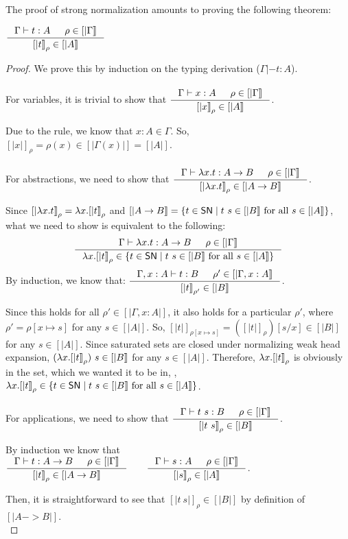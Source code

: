 The proof of strong normalization amounts to proving the following theorem:
\begin{theorem}
$ \inference{\Gamma|- t:A & \rho \in [|\Gamma|]}{[|t|]_\rho \in [|A|]} $
\end{theorem}
\begin{proof}
We prove this by induction on the typing derivation ($\Gamma|- t:A$).
\paragraph{}
For variables, it is trivial to show that
$ \inference{\Gamma |- x:A & \rho \in [|\Gamma|]}{[|x|]_\rho \in [|A|]} $.

Due to the  rule, we know that $x:A \in \Gamma$.
So, $[|x|]_\rho =\rho(x)\in[|\Gamma(x)|] = [|A|]$.

\paragraph{}
For abstractions, we need to show that
$ \inference{\Gamma |- \l x.t : A -> B & \rho \in [|\Gamma|]}
	     {[|\l x.t|]_\rho \in [|A -> B|]} $.

Since $[|\lambda x.t|]_\rho = \lambda x.[|t|]_\rho$ and
$[|A -> B|] = \{ t\in \mathsf{SN} \mid t~s\in[|B|]~\text{for all}~s\in[|A|] \}$,
what we need to show is equivalent to the following:
\[ \inference{\Gamma |- \l x.t : A -> B & \rho \in [|\Gamma|]}
	     {\l x.[|t|]_\rho \in
		\{ t\in \SN \mid t~s\in[|B|] ~\text{for all}~ s\in[|A|] \} }
\]
By induction, we know that:
$ \inference{\Gamma,x:A |- t : B & \rho' \in [|\Gamma,x:A|]}
	     {[|t|]_{\rho'} \in [|B|]} $.

Since this holds for all $\rho' \in [|\Gamma,x:A|]$, it also holds
for a particular $\rho'$, where $\rho' = \rho[x \mapsto s]$ for any $s \in [|A|]$.
So, $[|t|]_{\rho[x\mapsto s]} = ([|t|]_\rho)[s/x]\in[|B|]$ for any $s\in[|A|]$.
Since saturated sets are closed under normalizing weak head expansion,
$(\lambda x.[|t|]_\rho)~s \in[|B|]$ for any $s\in[|A|]$.
Therefore, $\lambda x.[|t|]_\rho$ is obviously in the set,
which we wanted it to be in, \ie,
$\lambda x.[|t|]_\rho\in\{t\in \mathsf{SN} \mid t~s\in[|B|] ~\text{for all}~ s\in[|A|]\}$.

\paragraph{}
For applications, we need to show that
$ \inference{\Gamma |- t~s : B & \rho\in[|\Gamma|]}{[|t~s|]_\rho \in [|B|]} $.

By induction we know that
$
\inference{\Gamma |- t : A -> B & \rho\in[|\Gamma|]}{[|t|]_\rho \in [|A -> B|]}
\qquad
\inference{\Gamma |- s : A & \rho\in[|\Gamma|]}{[|s|]_\rho \in [|A|]}
$.

Then, it is straightforward to see that $[|t~s|]_\rho\in[|B|]$
by definition of $[|A -> B|]$.\\
\end{proof}

